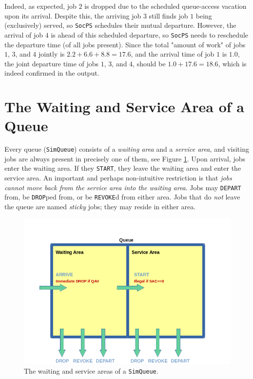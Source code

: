 \documentclass[12pt]{book}
\begin{document}
Indeed, as expected, job $2$ is dropped due to the scheduled queue-access vacation
  upon its arrival.
Despite this,
  the arriving job $3$ still finds job $1$ being (exclusively) served,
  so \lstinline|SocPS| schedules their mutual departure.
However,
  the arrival of job $4$ is ahead of this scheduled departure,
  so \lstinline|SocPS| needs to reschedule the departure time
  (of all jobs present).
Since the total "amount of work"
  of jobs $1$, $3$, and $4$ jointly is $2.2 + 6.6 + 8.8 = 17.6$,
  and the arrival time of job $1$ is $1.0$,
  the joint departure time of jobs $1$, $3$, and $4$,
  should be $1.0+17.6=18.6$,
  which is indeed confirmed in the output.

\section{The Waiting and Service Area of a Queue}
\label{sec:guided:wait-serv-area}

Every queue (\lstinline|SimQueue|) consists of
  a {\em waiting area\/} and a {\em service area},
  and visiting jobs are always present in precisely
  one of them,
  see Figure \ref{fig:WaitingAndServiceArea}.
Upon arrival, jobs enter the waiting area.
If they \lstinline|START|,
  they leave the waiting area and
  enter the service area.
An important and perhaps non-intuitive restriction
  is that {\em jobs cannot move back from the service area
  into the waiting area}.
Jobs may \lstinline|DEPART| from,
  be \lstinline|DROP|ped from,
  or be \lstinline|REVOKE|d from
  either area.
Jobs that do {\em not\/} leave the queue
  are named {\em sticky\/} jobs;
  they may reside in either area.

\begin{figure}[h]
\label{fig:WaitingAndServiceArea}
\caption{The waiting and service areas of a \lstinline|SimQueue|.}
\includegraphics[width=\textwidth]{WaitingAndServiceArea}
\end{figure}
\end{document}
